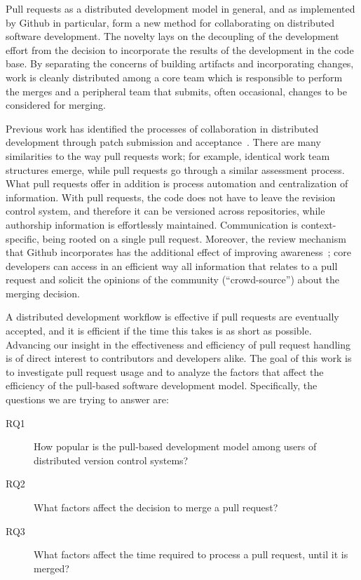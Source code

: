 \documentclass{acm_proc_article-sp}
\begin{document}
Pull requests as a distributed development model
in general, and as implemented by Github in particular,
form a new method for collaborating on distributed software development. The
novelty lays on the decoupling of the development effort from the decision to
incorporate the results of the development in the code base. By separating the
concerns of building artifacts and incorporating changes, work is cleanly
distributed among a core team which is responsible to perform the merges and a
peripheral team that submits, often occasional, changes to be considered for
merging.

Previous work has identified the processes of collaboration in
distributed development through patch submission and acceptance~\cite{MOCKU02,
Bird07, Weiss08}. There are many similarities to the way pull requests work; for
example, identical work team structures emerge, 
while pull requests go through a similar assessment
process. What pull requests offer in addition is process automation and
centralization of information. With pull requests, the code does not have to
leave the revision control system, and therefore it can be versioned across
repositories, while authorship information is effortlessly maintained.
Communication is context-specific, being rooted on a single pull request.
Moreover, the review mechanism that Github incorporates has the additional
effect of improving awareness~\cite{Dabbi12}; core developers can access in an
efficient way all information that relates to a pull request and solicit the
opinions of the community (``crowd-source'') about the merging decision.

A distributed development workflow is effective if
pull requests are eventually accepted, and it is efficient if the time this
takes is as short as possible. Advancing our insight in the effectiveness and
efficiency of pull request handling is of direct interest to contributors 
and developers alike.
The goal of this work is to investigate pull request usage and to analyze the
factors that affect the efficiency of the pull-based software development model.
Specifically, the questions we are trying to answer are: 

\begin{description}

  \item[RQ1] How popular is the pull-based development model among users of distributed version control systems?

  \item[RQ2] What factors affect the decision to merge a pull request?

  \item[RQ3] What factors affect the time required to process a pull request,
    until it is merged?

\end{description}
\end{document}
